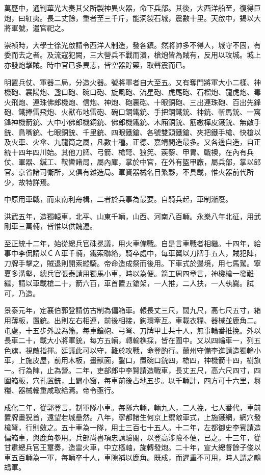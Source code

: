 萬歷中，通判華光大奏其父所製神異火器，命下兵部。其後，大西洋船至，復得巨炮，曰紅夷。長二丈餘，重者至三千斤，能洞裂石城，震數十里。天啟中，錫以大將軍號，遣官祀之。

崇禎時，大學士徐光啟請令西洋人制造，發各鎮。然將帥多不得人，城守不固，有委而去之者。及流寇犯闕，三大營兵不戰而潰，槍炮皆為賊有，反用以攻城。城上亦發炮擊賊。時中官已多異志，皆空器貯藥，取聲震而已。

明置兵仗、軍器二局，分造火器。號將軍者自大至五。又有奪門將軍大小二樣、神機砲、襄陽炮、盞口砲、碗口砲、旋風砲、流星砲、虎尾砲、石榴炮、龍虎炮、毒火飛炮、連珠佛郎機炮、信炮、神炮、砲裏砲、十眼銅砲、三出連珠砲、百出先鋒砲、鐵捧雷飛炮、火獸布地雷砲、碗口銅鐵銃、手把銅鐵銃、神銃、斬馬銃、一窩鋒神機箭銃、大中小佛郎機銅銃、佛郎機鐵銃、木廂銅銃、筋繳樺皮鐵銃、無敵手銃、鳥嘴銃、七眼銅銃、千里銃、四眼鐵鎗、各號雙頭鐵鎗、夾把鐵手槍、快槍以及火車、火傘、九龍筒之屬，凡數十種。正德、嘉靖間造最多。又各邊自造，自正統十四年四川始。其他刀牌、弓箭、槍弩、狼筅、蒺藜、甲胄、戰襖，在內有兵仗、軍器、鍼工、鞍轡諸局，屬內庫，掌於中官，在外有盔甲廠，屬兵部，掌以郎官。京省諸司衛所，又俱有雜造局。軍資器械名目繁夥，不具載，惟火器前代所少，故特詳焉。

中原用車戰，而東南利舟楫，二者於兵事為最要。自騎兵起，車制漸廢。

洪武五年，造獨轅車，北平、山東千輛，山西、河南八百輛。永樂八年北征，用武剛車三萬輛，皆惟以供餽運。

至正統十二年，始從總兵官硃冕議，用火車備戰。自是言車戰者相繼。十四年，給事中李侃請以ＣＡ車千輛，鐵索聯絡，騎卒處中，每車翼以刀牌手五人，賊犯陣，刀牌手擊之，賊退則開索縱騎。帝命造成祭而後用。下車式於邊境，用七馬駕。寧夏多溝壑，總兵官張泰請用獨馬小車，時以為便。箭工周四章言，神機槍一發難繼，請以車載槍二十，箭六百，車首置五鎗架，一人推，二人扶，一人執爨。試可，乃造。

景泰元年，定襄伯郭登請仿古制為偏箱車。轅長丈三尺，闊九尺，高七尺五寸，箱用薄板，置銃。出則左右相連，前後相接，鉤環牽互。車載衣糧、器械並鹿角二。屯處，十五步外設為籓。每車鎗砲、弓弩、刀牌甲士共十人，無事輪番推挽。外以長車二十，載大小將軍銃，每方五輛，轉輸樵採，皆在圍中。又以四輪車一，列五色旗，視敵指揮。廷議此可以守，難於攻戰，命登酌行。蘭州守備李進請造獨輪小車，上施皮屋，前用木板，畫獸面，鑿口，置碗口銃四，槍四，神機箭十四，樹旗一。行為陣，止為營。二年，吏部郎中李賢請造戰車，長丈五尺，高六尺四寸，四圍箱板，穴孔置銃，上闢小窗，每車前後占地五步。以千輛計，四方可十六里，芻糧、器械輜重咸取給焉。帝令亟行。

成化二年，從郭登言，制軍隊小車。每隊六輛，輛九人，二人挽，七人番代，車前置牌畫猊首，遠望若城壘然。八年，寧都諸生何京上禦敵車式，上施鐵網，網穴發槍弩，行則斂之。五十車為一隊，用士三百七十五人。十二年，左都御史李賓請造偏箱車，與鹿角參用。兵部尚書項忠請驗閱，以登高涉險不便，已之。十三年，從甘肅總兵官王璽奏，造雷火車，中立樞軸，旋轉發炮。二十年，宣大總督餘子俊以車五百輛為一軍，每輛卒十人，車隙補以鹿角。既成，而遲重不可用，時人謂之鷓鴣軍。

